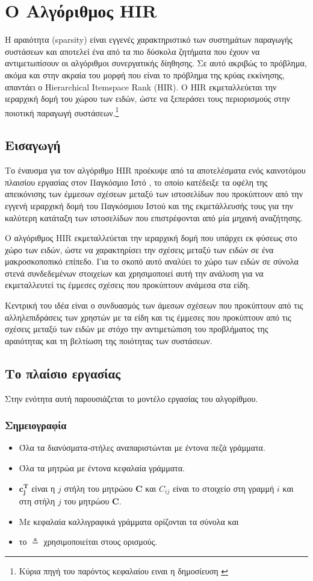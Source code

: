 \chapter{Ο Αλγόριθμος {\en HIR}}
\label{Chapter3}
Η αραιότητα ({\en sparsity}) είναι εγγενές χαρακτηριστικό των συστημάτων παραγωγής συστάσεων και αποτελεί ένα από τα πιο δύσκολα ζητήματα που έχουν να αντιμετωπίσουν οι αλγόριθμοι συνεργατικής δίηθησης. Σε αυτό ακριβώς το πρόβλημα, ακόμα και στην ακραία του μορφή που είναι το πρόβλημα της κρύας εκκίνησης, απαντάει ο {\en Hierarchical Itemspace Rank (HIR). O HIR} εκμεταλλεύεται την ιεραρχική δομή του χώρου των ειδών, ώστε να ξεπεράσει τους περιορισμούς στην ποιοτική παραγωγή συστάσεων\cite{Nikolakopoulos2015126}.\footnote{Κύρια πηγή του παρόντος κεφαλαίου ειναι η δημοσίευση \cite{Nikolakopoulos2015126}}
\section{Εισαγωγή}
Το έναυσμα για τον αλγόριθμο {\en HIR} προέκυψε από τα αποτελέσματα ενός καινοτόμου πλαισίου εργασίας στον Παγκόσμιο Ιστό \cite{Nikolakopoulos:2013:NNR:2433396.2433415}, το οποίο κατέδειξε τα οφέλη της απεικόνισης των έμμεσων σχέσεων μεταξύ των ιστοσελίδων που προκύπτουν από την εγγενή ιεραρχική δομή του Παγκόσμιου Ιστού και της εκμετάλλευσής τους για την καλύτερη κατάταξη των ιστοσελίδων που επιστρέφονται από μία μηχανή αναζήτησης. \par
Ο αλγόριθμος {\en HIR} εκμεταλλεύεται την ιεραρχική δομή που υπάρχει εκ φύσεως στο χώρο των ειδών, ώστε να χαρακτηρίσει την σχέσεις μεταξύ των ειδών σε ένα μακροσκοποπικό επίπεδο. Για το σκοπό αυτό αναλύει το χώρο των ειδών σε σύνολα στενά συνδεδεμένων στοιχείων και χρησιμοποιεί αυτή την ανάλυση για να εκμεταλλευτεί τις έμμεσες σχέσεις που προκύπτουν ανάμεσα στα είδη. \par
Κεντρική του ιδέα είναι ο συνδυασμός των άμεσων σχέσεων που προκύπτουν από τις αλληλεπιδράσεις των χρηστών με τα είδη και τις έμμεσες που προκύπτουν από τις σχέσεις μεταξύ των ειδών με στόχο την αντιμετώπιση του προβλήματος της αραιότητας και τη βελτίωση της ποιότητας των συστάσεων.
\section{Το πλαίσιο εργασίας}
Στην ενότητα αυτή παρουσιάζεται το μοντέλο εργασίας του αλγορίθμου.
\subsection{Σημειογραφία}
\begin{itemize}
 \item Όλα τα διανύσματα-στήλες αναπαριστώνται με έντονα πεζά γράμματα.
 \item Όλα τα μητρώα με έντονα κεφαλαία γράμματα.
 \item $\mathbf{c_j^T}$ είναι η $j$ στήλη του μητρώου $\mathbf{C}$ και $C_{ij}$ είναι το στοιχείο στη γραμμή $i$ και στη στήλη $j$ του μητρώου $\mathbf{C}$.
 \item Με κεφαλαία καλλιγραφικά γράμματα ορίζονται τα σύνολα και
 \item το $\triangleq$ χρησιμοποιείται στους ορισμούς.
\end{itemize}
